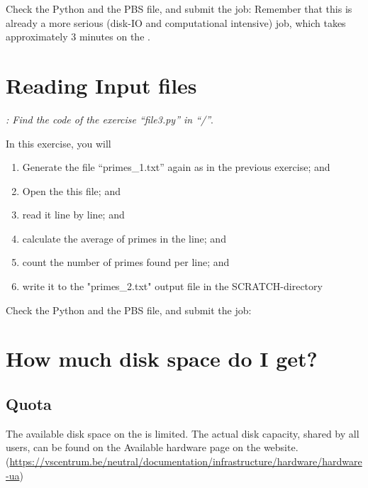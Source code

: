 Check the Python and the PBS file, and submit the job: Remember that this is
already a more serious (disk-IO and computational intensive) job, which takes
approximately 3 minutes on the \hpc.

\begin{prompt}
\end{prompt}

\section{Reading Input files}

\textit{: Find the code of the exercise ``file3.py'' in
``\tilde/\exampledir''}.

In this exercise, you will
\begin{enumerate}
\item  Generate the file ``primes\_1.txt'' again as in the previous exercise; and
\item  Open the this file; and
\item  read it line by line; and
\item  calculate the average of primes in the line; and
\item  count the number of primes found per line; and
\item  write it to the "primes\_2.txt" output file in the SCRATCH-directory
\end{enumerate}

Check the Python and the PBS file, and submit the job:

\begin{prompt}
\end{prompt}

\section{How much disk space do I get?}

\subsection{Quota}

\ifantwerpen
The available disk space on the \hpc is limited. The actual disk capacity,
shared by all users, can be found on the Available hardware page on the
website.
(\url{https://vscentrum.be/neutral/documentation/infrastructure/hardware/hardware-ua})

